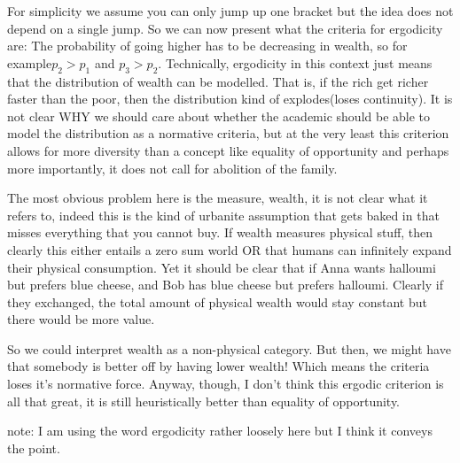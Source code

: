 \documentclass{report}
\begin{document}
For simplicity we assume you can only jump up one bracket but the idea does not depend on a single jump. So we can now present what the criteria for ergodicity are: The probability of going higher has to be decreasing in wealth, so for example$p_2>p_1$ and $p_3>p_2$. Technically, ergodicity in this context just means that the distribution of wealth can be modelled. That is, if the rich get richer faster than the poor, then the distribution kind of explodes(loses continuity). It is not clear WHY we should care about whether the academic should be able to model the distribution as a normative criteria, but at the very least this criterion allows for more diversity than a concept like equality of opportunity and perhaps more importantly, it does not call for abolition of the family. 

The most obvious problem here is the measure, wealth, it is not clear what it refers to, indeed this is the kind of urbanite assumption that gets baked in that misses everything that you cannot buy. If wealth measures physical stuff, then clearly this either entails a zero sum world OR that humans can infinitely expand their physical consumption. Yet it should be clear that if Anna wants halloumi but prefers blue cheese, and Bob has blue cheese but prefers halloumi. Clearly if they exchanged, the total amount of physical wealth would stay constant but there would be more value. 

So we could interpret wealth as a non-physical category. But then, we might have that somebody is better off by having lower wealth! Which means the criteria loses it's normative force. Anyway, though, I don't think this ergodic criterion is all that great, it is still heuristically better than equality of opportunity. 

note: I am using the word ergodicity rather loosely here but I think it conveys the point. 
\end{document}
